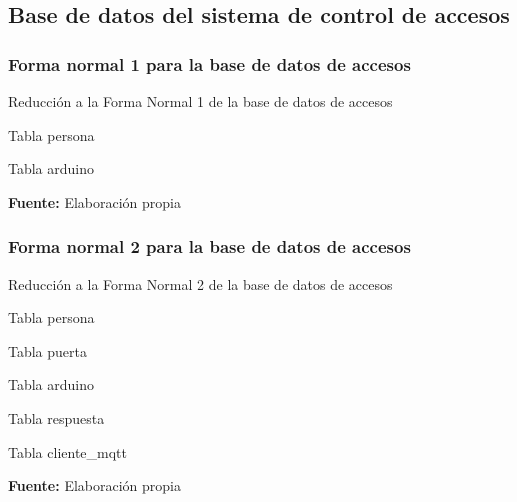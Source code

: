 \documentclass[../principal]{subfiles}
\begin{document}
  \subsection{Base de datos del sistema de control de accesos}

  \subsubsection{Forma normal 1 para la base de datos de accesos}

  \begin{table}[H]
    \caption{Reducción a la Forma Normal 1 de la base de datos de accesos}
    \begin{subtable}{\linewidth}
      \centering
      \caption{Tabla persona}
      
    \end{subtable}
    \begin{subtable}{\linewidth}
      \centering
      \caption{Tabla arduino}
      
    \end{subtable} 
    \caption*{\textbf{Fuente:} Elaboración propia}
    \label{tab:base_datos_accesos_fn1}
  \end{table}

  \subsubsection{Forma normal 2 para la base de datos de accesos}

  \begin{table}[H]
    \caption{Reducción a la Forma Normal 2 de la base de datos de accesos}
    \begin{subtable}{\linewidth}
      \centering
      \caption{Tabla persona}
      
    \end{subtable}
    \begin{subtable}{\linewidth}
      \centering
      \caption{Tabla puerta}
      
    \end{subtable}
    \begin{subtable}{\linewidth}
      \centering
      \caption{Tabla arduino}
      
    \end{subtable}
    \begin{subtable}{\linewidth}
      \centering
      \caption{Tabla respuesta}
      
    \end{subtable}
    \begin{subtable}{\linewidth}
      \centering
      \caption{Tabla cliente\_mqtt}
      
    \end{subtable}
    \caption*{\textbf{Fuente:} Elaboración propia}
    \label{tab:base_datos_accesos_fn2}
  \end{table}
\end{document}
